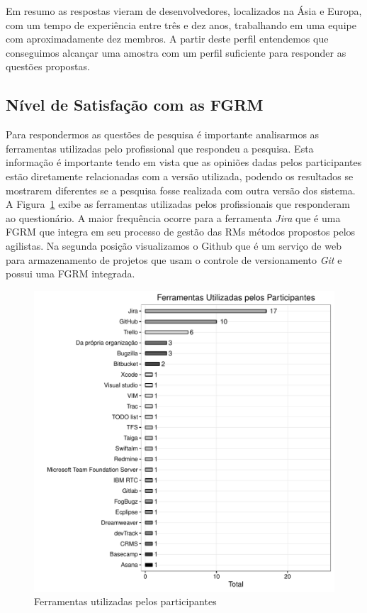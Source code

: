Em resumo as respostas vieram de desenvolvedores, localizados na Ásia e Europa,
com um tempo de experiência entre três e dez anos, trabalhando em uma equipe com
aproximadamente dez membros. A partir deste perfil entendemos que conseguimos
alcançar uma amostra com um perfil suficiente para responder as questões
propostas.

\subsection{Nível de Satisfação com as FGRM}
\label{sub:nivel_de_satisfação_com_as_fgrm}

Para respondermos as questões de pesquisa é importante analisarmos as
ferramentas utilizadas pelo profissional que respondeu a pesquisa. Esta
informação é importante tendo em vista que as opiniões dadas pelos
participantes estão diretamente relacionadas com a versão utilizada, podendo os
resultados se mostrarem diferentes se a pesquisa fosse realizada com outra
versão dos sistema.  A
Figura~\ref{fig:grafico_melhorias_fgrm_ferramentas_utilizadas} exibe as
ferramentas utilizadas pelos profissionais que responderam ao questionário. A
maior frequência ocorre para a ferramenta \textit{Jira} que é uma FGRM que
integra em seu processo de gestão das RMs métodos propostos pelos agilistas. Na
segunda posição visualizamos o Github que é um serviço de web para armazenamento
de projetos que usam o controle de versionamento \textit{Git} e possui uma FGRM
integrada.

\begin{figure}[htpb]
	\centering
	\includegraphics[width=0.8\linewidth]{./chapter-pesquisa-com-profissionais/img/grafico_melhorias_fgrm_ferramentas_utilizadas.pdf}
	\caption{Ferramentas utilizadas pelos participantes}
\label{fig:grafico_melhorias_fgrm_ferramentas_utilizadas}
\end{figure}

